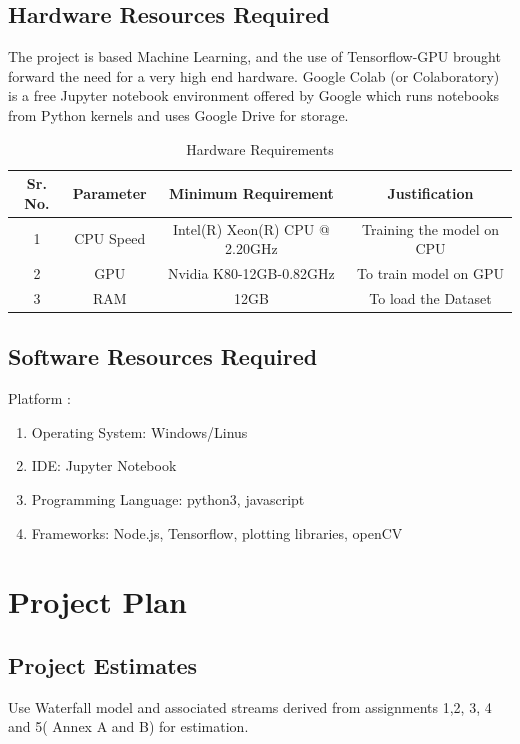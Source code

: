 \documentclass[oneside,a4paper,12pt]{report}
\begin{document}
\section{Hardware Resources Required}
The project is based Machine Learning, and the use of Tensorflow-GPU brought forward the need for a very high end hardware. Google Colab (or Colaboratory) is a free Jupyter notebook environment offered by Google which runs notebooks from Python kernels and uses Google Drive for storage.
\begin{table}[!htbp]
\begin{center}
\def\arraystretch{1.5}
  \begin{tabular}{| c | c | c | c |}
\hline
Sr. No. &	Parameter &	Minimum Requirement & Justification \\
\hline
1 &	CPU Speed &	 Intel(R) Xeon(R) CPU @ 2.20GHz  & Training the model on CPU\\
\hline
2 &	GPU  &	Nvidia K80-12GB-0.82GHz &  To train model on GPU\\
3 &	RAM  &	12GB &  To load the Dataset\\
 \hline

  \hline
\end{tabular}
 \caption { Hardware Requirements }
 \label{tab:hreq}
\end{center}

\section{Software Resources Required}
Platform :
\begin{enumerate}
\item Operating System: Windows/Linus
\item IDE: Jupyter Notebook
\item Programming Language: python3, javascript
\item Frameworks: Node.js, Tensorflow, plotting libraries, openCV
\end{enumerate}




\chapter{Project Plan}

\section{Project Estimates}
                 Use Waterfall model and associated streams derived from assignments 1,2, 3, 4 and 5( Annex A and B) for estimation.

\end{table}
\end{document}
